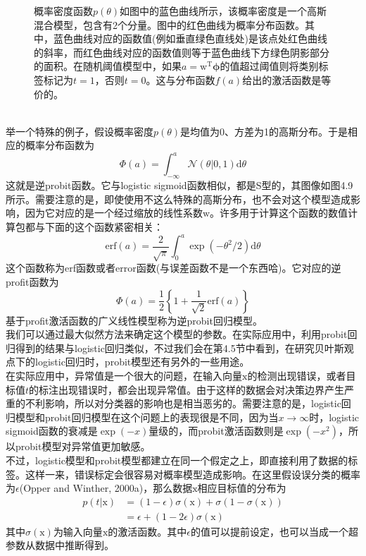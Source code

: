 \documentclass[b5paper]{book}
\numberwithin{equation}{chapter}
\newcommand {\bx} {\boldsymbol{\mathrm{x}}}
\newcommand {\bw} {\boldsymbol{\mathrm{w}}}
\newcommand {\rmT} {\mathrm{T}}
\newcommand {\rmd} {\mathrm{d}}
\newcommand {\bfphi} {\boldsymbol{\phi}}
\begin{document}
{\begin{figure}[ht]
		\label{fig:4-13}
		\caption{概率密度函数$p(\theta)$如图中的蓝色曲线所示，该概率密度是一个高斯混合模型，包含有2个分量。图中的红色曲线为概率分布函数。其中，蓝色曲线对应的函数值(例如垂直绿色直线处)是该点处红色曲线的斜率，而红色曲线对应的函数值则等于蓝色曲线下方绿色阴影部分的面积。在随机阈值模型中，如果$a = \bw^{\rmT} \bfphi$的值超过阈值则将类别标签标记为$t = 1$，否则$t = 0$。这与分布函数$f(a)$给出的激活函数是等价的。}
	\end{figure}
	\\
	\indent 举一个特殊的例子，假设概率密度$p(\theta)$是均值为0、方差为1的高斯分布。于是相应的概率分布函数为
	\begin{equation}
		\Phi(a) = \int_{-\infty}^a \mathcal{N}(\theta | 0,1)\rmd \theta
	\end{equation}
	这就是逆probit函数。它与logistic sigmoid函数相似，都是S型的，其图像如图4.9所示。需要注意的是，即使使用不这么特殊的高斯分布，也不会对这个模型造成影响，因为它对应的是一个经过缩放的线性系数$\bw$。许多用于计算这个函数的数值计算包都与下面的这个函数紧密相关：
	\begin{equation}
		\mathrm{erf}(a) = \frac{2}{\sqrt{\pi}}\int_0 ^a \exp(-\theta^2/2)\rmd \theta
	\end{equation}
	这个函数称为erf函数或者error函数(与误差函数不是一个东西哈)。它对应的逆profit函数为
	\begin{equation}
		\Phi(a) = \frac{1}{2}\left\{1 + \frac{1}{\sqrt{2}}\mathrm{erf}(a)\right\}
	\end{equation}
	基于profit激活函数的广义线性模型称为逆probit回归模型。\\
	\indent 我们可以通过最大似然方法来确定这个模型的参数。在实际应用中，利用probit回归得到的结果与logistic回归类似，不过我们会在第4.5节中看到，在研究贝叶斯观点下的logistic回归时，probit模型还有另外的一些用途。\\
	\indent 在实际应用中，异常值是一个很大的问题，在输入向量$\bx$的检测出现错误，或者目标值$t$的标注出现错误时，都会出现异常值。由于这样的数据会对决策边界产生严重的不利影响，所以对分类器的影响也是相当恶劣的。需要注意的是，logistic回归模型和probit回归模型在这个问题上的表现很是不同，因为当$x \rightarrow \infty$时，logistic sigmoid函数的衰减是$\exp(-x)$量级的，而probit激活函数则是$\exp(-x^2)$，所以probit模型对异常值更加敏感。\\
	\indent 不过，logistic模型和probit模型都建立在同一个假定之上，即直接利用了数据的标签。这样一来，错误标定会很容易对概率模型造成影响。在这里假设误分类的概率为$\epsilon$(Opper and Winther, 2000a)，那么数据$\bx$相应目标值的分布为
	\begin{equation}
	\begin{split}
		p(t|\bx) &= (1 - \epsilon) \sigma(\bx) + \sigma(1 - \sigma(\bx)) \\
		&= \epsilon + (1 - 2\epsilon)\sigma(\bx)
	\end{split}
	\end{equation}
	其中$\sigma(\bx)$为输入向量$\bx$的激活函数。其中$\epsilon$的值可以提前设定，也可以当成一个超参数从数据中推断得到。
	}
\end{document}
